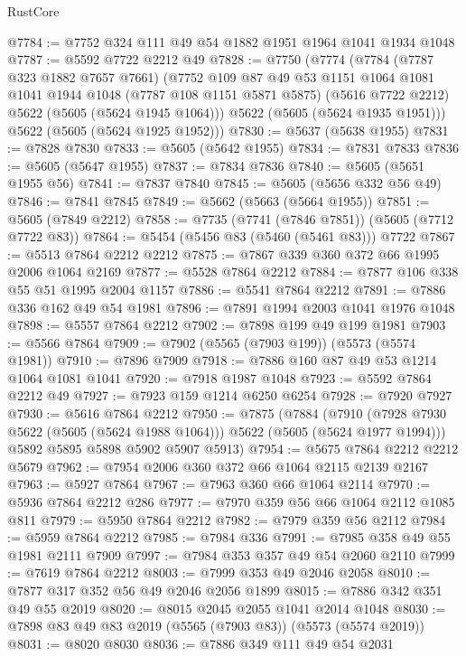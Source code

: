 \begin{lexlean}{RustCore}
\begin{coremodule}
@7784 := @7752 @324 @111 @49 @54 @1882 @1951 @1964 @1041 @1934 @1048
@7787 := @5592 @7722 @2212 @49
@7828 := @7750
    (@7774
      (@7784
        (@7787 @323 @1882 @7657 @7661)
        (@7752
          @109
          @87
          @49
          @53
          @1151
          @1064
          @1081
          @1041
          @1944
          @1048
          (@7787 @108 @1151 @5871 @5875)
          (@5616 @7722 @2212)
          @5622
          (@5605 (@5624 @1945 @1064)))
        @5622
        (@5605 (@5624 @1935 @1951)))
      @5622
      (@5605 (@5624 @1925 @1952)))
@7830 := @5637 (@5638 @1955)
@7831 := @7828 @7830
@7833 := @5605 (@5642 @1955)
@7834 := @7831 @7833
@7836 := @5605 (@5647 @1955)
@7837 := @7834 @7836
@7840 := @5605 (@5651 @1955 @56)
@7841 := @7837 @7840
@7845 := @5605 (@5656 @332 @56 @49)
@7846 := @7841 @7845
@7849 := @5662 (@5663 (@5664 @1955))
@7851 := @5605 (@7849 @2212)
@7858 := @7735 (@7741 (@7846 @7851)) (@5605 (@7712 @7722 @83))
@7864 := @5454 (@5456 @83 (@5460 (@5461 @83))) @7722
@7867 := @5513 @7864 @2212 @2212
@7875 := @7867 @339 @360 @372 @66 @1995 @2006 @1064 @2169
@7877 := @5528 @7864 @2212
@7884 := @7877 @106 @338 @55 @51 @1995 @2004 @1157
@7886 := @5541 @7864 @2212
@7891 := @7886 @336 @162 @49 @54 @1981
@7896 := @7891 @1994 @2003 @1041 @1976 @1048
@7898 := @5557 @7864 @2212
@7902 := @7898 @199 @49 @199 @1981
@7903 := @5566 @7864
@7909 := @7902 (@5565 (@7903 @199)) (@5573 (@5574 @1981))
@7910 := @7896 @7909
@7918 := @7886 @160 @87 @49 @53 @1214 @1064 @1081 @1041
@7920 := @7918 @1987 @1048
@7923 := @5592 @7864 @2212 @49
@7927 := @7923 @159 @1214 @6250 @6254
@7928 := @7920 @7927
@7930 := @5616 @7864 @2212
@7950 := @7875
    (@7884
      (@7910 (@7928 @7930 @5622 (@5605 (@5624 @1988 @1064))) @5622 (@5605 (@5624 @1977 @1994)))
      @5892
      @5895
      @5898
      @5902
      @5907
      @5913)
@7954 := @5675 @7864 @2212 @2212 @5679
@7962 := @7954 @2006 @360 @372 @66 @1064 @2115 @2139 @2167
@7963 := @5927 @7864
@7967 := @7963 @360 @66 @1064 @2114
@7970 := @5936 @7864 @2212 @286
@7977 := @7970 @359 @56 @66 @1064 @2112 @1085 @811
@7979 := @5950 @7864 @2212
@7982 := @7979 @359 @56 @2112
@7984 := @5959 @7864 @2212
@7985 := @7984 @336
@7991 := @7985 @358 @49 @55 @1981 @2111 @7909
@7997 := @7984 @353 @357 @49 @54 @2060 @2110
@7999 := @7619 @7864 @2212
@8003 := @7999 @353 @49 @2046 @2058
@8010 := @7877 @317 @352 @56 @49 @2046 @2056 @1899
@8015 := @7886 @342 @351 @49 @55 @2019
@8020 := @8015 @2045 @2055 @1041 @2014 @1048
@8030 := @7898 @83 @49 @83 @2019 (@5565 (@7903 @83)) (@5573 (@5574 @2019))
@8031 := @8020 @8030
@8036 := @7886 @349 @111 @49 @54 @2031

\end{coremodule}
\end{lexlean}
